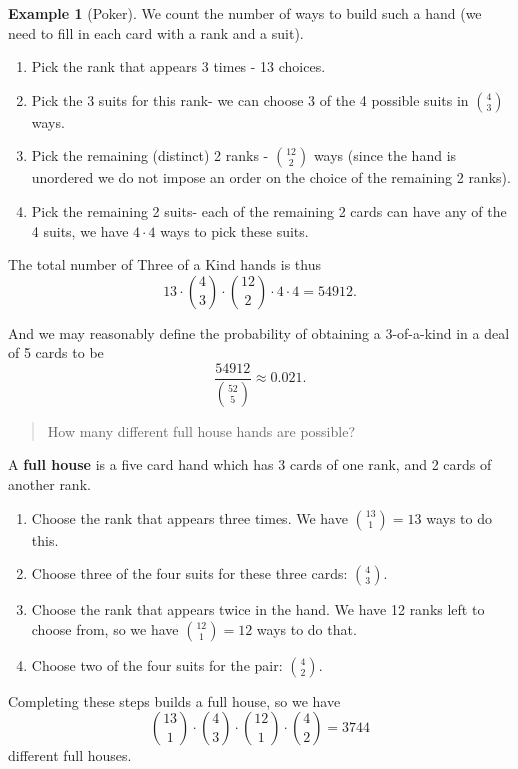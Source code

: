 \documentclass[
]{book}
\providecommand{\tightlist}{%
  \setlength{\itemsep}{0pt}\setlength{\parskip}{0pt}}
\theoremstyle{definition}
\theoremstyle{definition}
\newtheorem{example}{Example}[chapter]
\theoremstyle{definition}
\theoremstyle{definition}
\theoremstyle{remark}
\begin{document}
\begin{example}[Poker]
We count the number of ways to build such a hand (we need to fill in each card with a rank and a suit).

\begin{enumerate}
\def\labelenumi{\arabic{enumi}.}
\tightlist
\item
  Pick the rank that appears 3 times - 13 choices.
\item
  Pick the 3 suits for this rank- we can choose 3 of the 4 possible suits in \(\binom{4}{3}\) ways.
\item
  Pick the remaining (distinct) 2 ranks - \(\binom{12}{2}\) ways (since the hand is unordered we do not impose an order on the choice of the remaining 2 ranks).
\item
  Pick the remaining 2 suits- each of the remaining 2 cards can have any of the 4 suits, we have \(4 \cdot 4\) ways to pick these suits.
\end{enumerate}

The total number of Three of a Kind hands is thus \[13\cdot\binom{4}{3}\cdot\binom{12}{2}\cdot4\cdot4 = 54912.\]

And we may reasonably define the probability of obtaining a 3-of-a-kind in a deal of 5 cards to be \[\frac{54912}{\binom{52}{5}}\approx 0.021.\]

\begin{quote}
How many different full house hands are possible?
\end{quote}

A \textbf{full house} is a five card hand which has 3 cards of one rank, and 2 cards of another rank.

\begin{enumerate}
\def\labelenumi{\arabic{enumi}.}
\tightlist
\item
  Choose the rank that appears three times. We have \(\binom{13}{1} = 13\) ways to do this.
\item
  Choose three of the four suits for these three cards: \(\binom{4}{3}\).
\item
  Choose the rank that appears twice in the hand. We have 12 ranks left to choose from, so we have \(\binom{12}{1} = 12\) ways to do that.
\item
  Choose two of the four suits for the pair: \(\binom{4}{2}\).
\end{enumerate}

Completing these steps builds a full house, so we have
\[\binom{13}{1}\cdot\binom{4}{3}\cdot \binom{12}{1}\cdot \binom{4}{2} = 3744\] different full houses.


\end{example}
\end{document}
